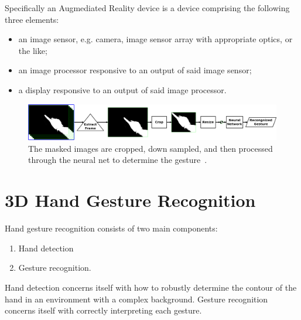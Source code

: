 Specifically an Augmediated Reality device is a device comprising the following three elements:
\begin{itemize}
 \item an image sensor, e.g. camera, image sensor array with appropriate optics,
       or the like;
 \item an image processor responsive to an output of said image sensor;
 \item a display responsive to an output of said image processor.
\end{itemize}

\begin{figure}
\centering
\includegraphics[width=\columnwidth]{ch5/figs/train_flow3.pdf}
\caption{The masked images are cropped, down sampled, and then processed through the neural net to determine the gesture~\cite{lo2013augmediated}.}
\label{flow_diagram}
\end{figure}

\section{3D Hand Gesture Recognition}
Hand gesture recognition consists of two main components:
\begin{enumerate}
    \item Hand detection
    \item Gesture recognition.
\end{enumerate}
Hand detection concerns itself with how to robustly determine the contour of the hand in an environment with a complex background. Gesture recognition concerns itself with correctly interpreting each gesture.

